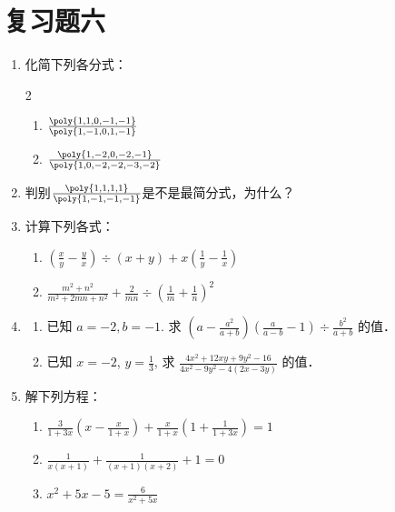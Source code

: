 \section*{复习题六}
\begin{enumerate}
    \item 化简下列各分式：
    \begin{multicols}{2}
\begin{enumerate}
    \item $\frac{\poly{1,1,0,-1,-1}}{\poly{1,-1,0,1,-1}}$
    \item $\frac{\poly{1,-2,0,-2,-1}}{\poly{1,0,-2,-2,-3,-2}}$
\end{enumerate}
\end{multicols}

\item 判别$\frac{\poly{1,1,1,1}}{\poly{1,-1,-1,-1}}$是不是最简分式，为什么？

\item 计算下列各式：
    \begin{enumerate}
    \item $\left(\frac{x}{y}-\frac{y}{x}\right) \div(x+y)+x\left(\frac{1}{y}-\frac{1}{x}\right)$
    \item $\frac{m^{2}+n^{2}}{m^{2}+2 m n+n^{2}}+\frac{2}{m n} \div\left(\frac{1}{m}+\frac{1}{n}\right)^{2}$
\end{enumerate}


\item \begin{enumerate}
    \item 已知 $a=-2, b=-1$. 求 $\left(a-\frac{a^{2}}{a+b}\right)\left(\frac{a}{a-b}-1\right)\div \frac{b^{2}}{a+b}$ 的值．
    \item 已知 $x=-2$, $y=\frac{1}{3}$, 求 $\frac{4 x^{2}+12 x y+9 y^{2}-16}{4 x^{2}-9 y^{2}-4(2 x-3 y)}$ 的值．
\end{enumerate}

\item 解下列方程：
\begin{enumerate}
    \item $\frac{3}{1+3 x}\left(x-\frac{x}{1+x}\right)+\frac{x}{1+x}\left(1+\frac{1}{1+3 x}\right)=1$
    \item $\frac{1}{x(x+1)}+\frac{1}{(x+1)(x+2)}+1=0$
    \item $x^{2}+5 x-5=\frac{6}{x^{2}+5 x}$
\end{enumerate}


\end{enumerate}
